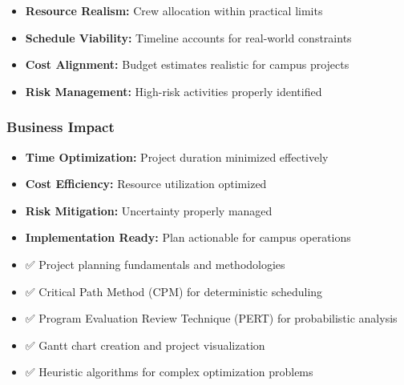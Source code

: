 \documentclass[
  letterpaper,
  DIV=11,
  numbers=noendperiod]{scrreprt}
\providecommand{\tightlist}{%
  \setlength{\itemsep}{0pt}\setlength{\parskip}{0pt}}
\begin{document}
\begin{itemize}
\tightlist
\item
  \textbf{Resource Realism:} Crew allocation within practical limits
\item
  \textbf{Schedule Viability:} Timeline accounts for real-world
  constraints
\item
  \textbf{Cost Alignment:} Budget estimates realistic for campus
  projects
\item
  \textbf{Risk Management:} High-risk activities properly identified
\end{itemize}

\subsubsection{Business Impact}\label{business-impact}

\begin{itemize}
\tightlist
\item
  \textbf{Time Optimization:} Project duration minimized effectively
\item
  \textbf{Cost Efficiency:} Resource utilization optimized
\item
  \textbf{Risk Mitigation:} Uncertainty properly managed
\item
  \textbf{Implementation Ready:} Plan actionable for campus operations
\end{itemize}

\begin{tcolorbox}[enhanced jigsaw, leftrule=.75mm, rightrule=.15mm, colback=white, colbacktitle=quarto-callout-note-color!10!white, arc=.35mm, opacityback=0, toptitle=1mm, bottomrule=.15mm, bottomtitle=1mm, titlerule=0mm, title=\textcolor{quarto-callout-note-color}{\faInfo}\hspace{0.5em}{Key Concepts Mastered}, toprule=.15mm, left=2mm, coltitle=black, breakable, colframe=quarto-callout-note-color-frame, opacitybacktitle=0.6]

\begin{itemize}
\tightlist
\item
  ✅ Project planning fundamentals and methodologies
\item
  ✅ Critical Path Method (CPM) for deterministic scheduling
\item
  ✅ Program Evaluation Review Technique (PERT) for probabilistic
  analysis
\item
  ✅ Gantt chart creation and project visualization
\item
  ✅ Heuristic algorithms for complex optimization problems
\end{itemize}

\end{tcolorbox}
\end{document}
